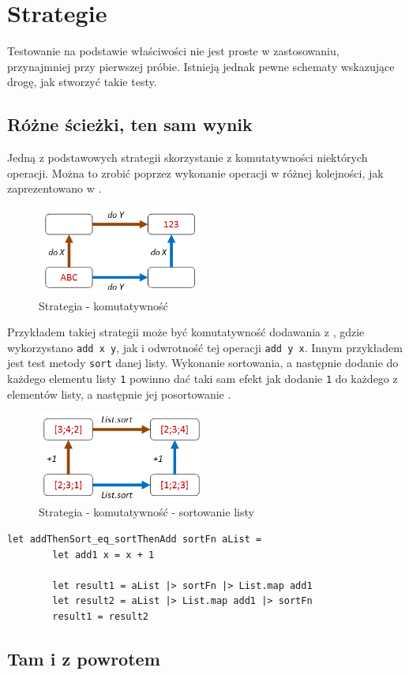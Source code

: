 \section{Strategie}

Testowanie na podstawie właściwości nie jest proste w zastosowaniu, przynajmniej przy pierwszej próbie.
Istnieją jednak pewne schematy wskazujące drogę, jak stworzyć takie testy.
\subsection{Różne ścieżki, ten sam wynik}

Jedną z podstawowych strategii skorzystanie z komutatywności niektórych operacji. Można to zrobić poprzez wykonanie operacji w różnej kolejności, jak zaprezentowano w .
\begin{figure}[h]
    \centering
    \includegraphics[width=0.5\textwidth]{images/property_commutative.png}
    \caption{Strategia - komutatywność}
    \label{fig:commutative_strategy}
\end{figure}

Przykładem takiej strategii może być komutatywność dodawania z , gdzie wykorzystano \texttt{add x y}, jak i odwrotność tej operacji \texttt{add y x}. 
Innym przykładem jest test metody \texttt{sort} danej listy. 
Wykonanie sortowania, a następnie dodanie do każdego elementu listy \texttt{1} powinno dać taki sam efekt jak dodanie \texttt{1} do każdego z elementów listy, a następnie jej posortowanie  .

\begin{figure}
    \centering
    \includegraphics[width=0.5\textwidth]{images/property_list_sort1.png}
    \caption{Strategia - komutatywność - sortowanie listy}
    \label{fig:commutative_strategy_list_sort}
\end{figure}
\lstset{language=FSharp, basicstyle=\scriptsize}
\begin{lstlisting}[frame=single,caption={Test sortowania listy z wykorzystaniem strategii komutatywnej},label=kod:list_sort_add1]
    let addThenSort_eq_sortThenAdd sortFn aList =
        let add1 x = x + 1

        let result1 = aList |> sortFn |> List.map add1
        let result2 = aList |> List.map add1 |> sortFn
        result1 = result2
\end{lstlisting}

\subsection{Tam i z powrotem}
     